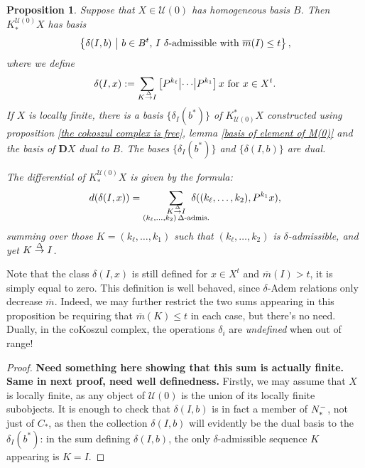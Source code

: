 \documentclass[11pt]{amsart}
\theoremstyle{plain}
\newtheorem{prop}[thm]{Proposition}
\theoremstyle{definition}
\newcommand{\calU}{\mathcal{U}}
\theoremstyle{plain}
\newcommand{\deltaalg}{\Delta} %
\newcommand{\minDimP}{\overline{m}}
\newcommand{\produces}[3]{#3:#1\sim #2}
\renewcommand{\produces}[3]{#1\rightarrow_{#3} #2}%
\renewcommand{\produces}[3]{#1\overset{\smash{#3}}{\rightarrow} #2}%
\newcommand{\Nop}{N^{\smash{-}}}
\newcommand{\dual}{\mathbf{D}}
\begin{document}
\begin{Koszul complexes}
\begin{prop}\label{propDerivedIndTrivialUobject n=0}
Suppose that $X\in\calU(0)$ has homogeneous basis $B$. Then $K_*^{\calU(0)}X$ has basis
\[\left\{\delta(I,b)\ \middle|\ b\in B^t\textup{, $I$ $\delta$-admissible with }\minDimP(I)\leq t\right\},\]
where we define
\[\delta(I,x):=
\sum_{\produces{K}{I}{\deltaalg}}\left[P^{k_\ell} \middle|\cdots\middle|P^{k_1} \right]x\textup{ for $x\in X^t$}.\]
%
If $X$ is locally finite, there is a basis $\{\delta_I(b^*)\}$ of $K^*_{\calU(0)}X$ constructed using proposition \ref{the cokoszul complex is free}, lemma \ref{basis of element of M(0)} and the basis of $\dual X$ dual to $B$. The bases $\{\delta_I(b^*)\}$ and $\{\delta(I,b)\}$ are dual.

The differential of $K^{\calU(0)}_*X$ is given by the formula:
\[d(\delta(I,x))=\sum_{ \substack{\produces{K}{I}{\deltaalg}\\(k_{\ell},\ldots,k_2){\,\deltaalg\textup{-admis.}}}}\!\!\!\!\!\!\!\!\!\!\!\! \delta((k_{\ell},\ldots,k_2),P^{k_1}x),\]
summing over those $K=(k_{\ell},\ldots,k_1)$ such that $(k_{\ell},\ldots,k_2)$ is $\delta$-admissible, and yet $\produces{K}{I}{\deltaalg}$.
\end{prop}
Note that the class $\delta(I,x)$ is still defined for $x\in X^t$ and $\minDimP(I)>t$, it is simply equal to zero. This definition is well behaved, since $\delta$-Adem relations only decrease $\minDimP$. Indeed, we may further restrict the two sums appearing in this proposition be requiring that $\minDimP(K)\leq t$ in each case, but there's no need. Dually, in the coKoszul complex, the operations $\delta_i$ are \emph{undefined} when out of range!
\begin{proof}\textbf{Need something here showing that this sum is actually finite. Same in next proof, need well definedness.}
Firstly, we may assume that $X$ is locally finite, as any object of $\calU(0)$ is the union of its locally finite subobjects. It is enough to check that $\delta(I,b)$ is in fact a member of $\Nop_*$, not just of $C_*$, as then the collection $\delta(I,b)$ will evidently be the dual basis to the $\delta_I(b^*)$: in the sum defining $\delta(I,b)$, the only $\delta$-admissible sequence $K$ appearing is $K=I$.  %


\end{proof}
\end{Koszul complexes}
\end{document}
